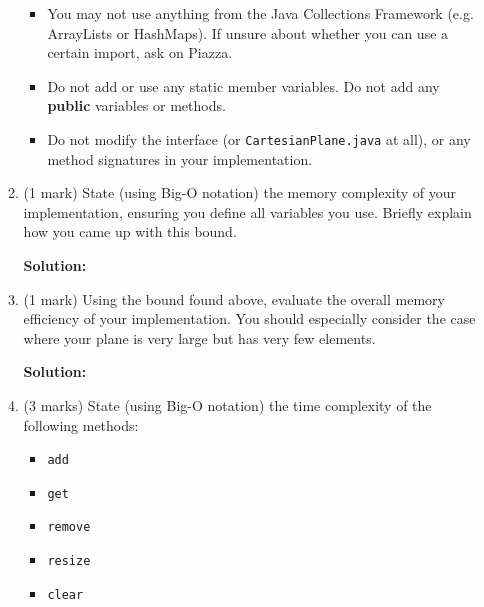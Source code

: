 \documentclass[a4,13pt]{extarticle}
\newenvironment{Solution}{\color{blue}\textbf{Solution:}}{}
\begin{document}
\begin{enumerate}
\begin{enumerate}
\begin{itemize}
	      	      	      	   	                          
	      	      	\item You may not use anything from the Java Collections Framework (e.g. ArrayLists or HashMaps). If unsure about whether you can use a certain import, ask on Piazza.
	      	      	                               
	      	      	\item Do not add or use any static member variables. Do not add any \textbf{public} variables or methods.
	      	      	\item Do not modify the interface (or \texttt{CartesianPlane.java} at all), or any method signatures in your implementation.
	      	      \end{itemize}
	      	      	      	                      
	      	\item (1 mark) State (using Big-O notation) the memory complexity of your implementation, 
	      	      ensuring you define all variables you use. Briefly explain how you came up with this bound.
	      	      
	        \begin{Solution}
	      	\end{Solution}
	      	      	      	                      
	      	\item (1 mark) Using the bound found above, evaluate the overall memory efficiency of your implementation. 
	      	      You should especially consider the case where your plane is very large but has very few elements.
	      	
	      	\begin{Solution}
	      	\end{Solution}
	      	      	      	                      
	      	\item (3 marks) State (using Big-O notation) the time complexity of the following methods:
	      	      	      	                      
	      	      \begin{itemize}
	      	      	\item \texttt{add}
	      	      	\item \texttt{get}
	      	      	\item \texttt{remove}
	      	      	\item \texttt{resize}
	      	      	\item \texttt{clear}
	      	      \end{itemize}
	      	      	      	                      

\end{enumerate}
\end{enumerate}
\end{document}
